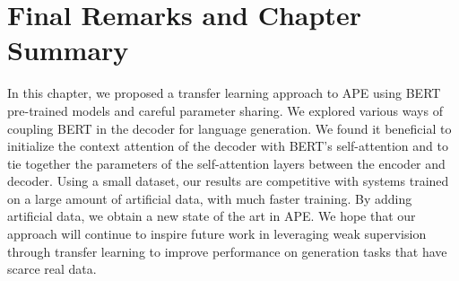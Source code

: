 \section{Final Remarks and Chapter Summary}

In this chapter, we proposed a transfer learning approach to APE
using BERT pre-trained models and careful parameter sharing. We
explored various ways of coupling BERT in the decoder for language
generation. We found it beneficial to initialize the context
attention of the decoder with BERT's self-attention and to tie
together the parameters of the self-attention layers between the
encoder and decoder. Using a small dataset, our results are
competitive with systems trained on a large amount of artificial
data, with much faster training. By adding artificial data, we obtain
a new state of the art in APE. We hope that our approach will
continue to inspire future work in leveraging weak supervision
through transfer learning to improve performance on generation tasks
that have scarce real data.

\cleardoublepage

\singlespacing